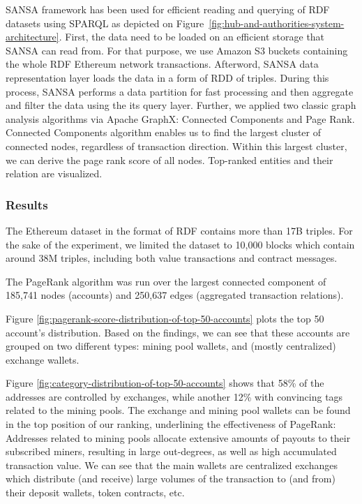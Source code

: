 SANSA framework has been used for efficient reading and querying of \gls{RDF} datasets using \gls{SPARQL} as depicted on Figure~\ref{fig:hub-and-authorities-system-architecture}. 
First, the data need to be loaded on an efficient storage that SANSA can read from. 
For that purpose, we use Amazon S3 buckets containing the whole \gls{RDF} Ethereum network transactions.
Afterword, SANSA data representation layer loads the data in a form of \gls{RDD} of triples. 
During this process, SANSA performs a data partition for fast processing and then aggregate and filter the data using the its query layer. Further, we applied two classic graph analysis algorithms via Apache GraphX: Connected Components and Page Rank.
Connected Components algorithm enables us to find the largest cluster of connected nodes, regardless of transaction direction. Within this largest cluster, we can derive the page rank score of all nodes. Top-ranked entities and their relation are visualized.

\subsubsection{Results}

The Ethereum dataset in the format of \gls{RDF} contains more than 17B triples.
For the sake of the experiment, we limited the dataset to 10,000 blocks which contain around 38M triples, including both value transactions and contract messages.

The PageRank algorithm was run over the largest connected component of 185,741 nodes (accounts) and 250,637 edges (aggregated transaction relations).

Figure \ref{fig:pagerank-score-distribution-of-top-50-accounts} plots the top 50 account's distribution. 
Based on the findings, we can see that these accounts are grouped on two different types: mining pool wallets, and (mostly centralized) exchange wallets. 

Figure \ref{fig:category-distribution-of-top-50-accounts} shows that 58\% of the addresses are controlled by exchanges, while another 12\% with convincing tags related to the mining pools.
The exchange and mining pool wallets can be found in the top position of our ranking, underlining the effectiveness of PageRank: Addresses related to mining pools allocate extensive amounts of payouts to their subscribed miners, resulting in large out-degrees, as well as high accumulated transaction value.
We can see that the main wallets are centralized exchanges which distribute (and receive) large volumes of the transaction to (and from) their deposit wallets, token contracts, etc.



